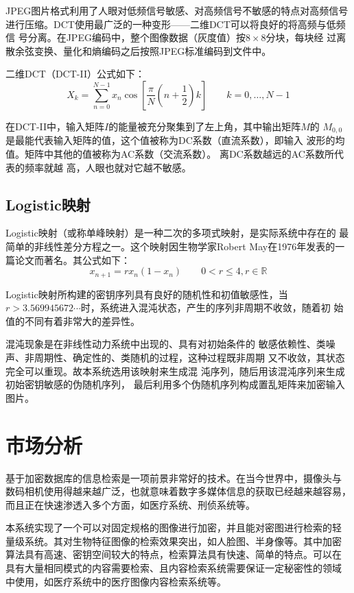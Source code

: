 JPEG图片格式利用了人眼对低频信号敏感、对高频信号不敏感的特点对高频信号
进行压缩。DCT使用最广泛的一种变形——二维DCT可以将良好的将高频与低频信
号分离。在JPEG编码中，整个图像数据（灰度值）按$8 \times 8$分块，每块经
过离散余弦变换、量化和熵编码之后按照JPEG标准编码到文件中。

二维DCT（DCT-II）公式如下：
\begin{displaymath}
X_k = \sum_{n = 0}^{N - 1} x_n \cos \left[\frac{\pi} N \left(n +
        \frac1 2\right) k\right] \qquad k = 0, \dotsc, N - 1
\end{displaymath}

在DCT-II中，输入矩阵$I$的能量被充分聚集到了左上角，其中输出矩阵$M$的
$M_{0, 0}$是最能代表输入矩阵的值，这个值被称为DC系数（直流系数），即输入
波形的均值。矩阵中其他的值被称为AC系数（交流系数）。
离DC系数越远的AC系数所代表的频率就越
高，人眼也就对它越不敏感。



\subsection{Logistic映射}
Logistic映射（或称单峰映射）是一种二次的多项式映射，是实际系统中存在的
最简单的非线性差分方程之一\cite{yang2011}。这个映射因生物学家Robert
May在1976年发表的一篇论文而著名。其公式如下：
\begin{displaymath}
x_{n + 1} = rx_n(1 - x_n) \qquad 0 < r \leq 4, r \in \mathbb{R}
\end{displaymath}

Logistic映射所构建的密钥序列具有良好的随机性和初值敏感性，当$r >
3.569945672\dotsb$时，系统进入混沌状态，产生的序列非周期不收敛，随着初
始值的不同有着非常大的差异性\cite{yang2011}。

混沌现象是在非线性动力系统中出现的、具有对初始条件的
敏感依赖性、类噪声、非周期性、确定性的、类随机的过程，这种过程既非周期
又不收敛，其状态完全可以重现\cite{lu2007}。故本系统选用该映射来生成混
沌序列，随后用该混沌序列来生成初始密钥敏感的伪随机序列，
最后利用多个伪随机序列构成置乱矩阵来加密输入图片。

\section{市场分析}
\label{sec:market-analysis}

基于加密数据库的信息检索是一项前景非常好的技术。在当今世界中，摄像头与
数码相机使用得越来越广泛，也就意味着数字多媒体信息的获取已经越来越容易，
而且正在快速渗透入多个方面，如医疗系统、刑侦系统等。

本系统实现了一个可以对固定规格的图像进行加密，并且能对密图进行检索的轻
量级系统。其对生物特征图像的检索效果突出，如人脸图、半身像等。其中加密
算法具有高速、密钥空间较大的特点，检索算法具有快速、简单的特点。可以在
具有大量相同模式的内容需要检索、且内容检索系统需要保证一定秘密性的领域
中使用，如医疗系统中的医疗图像内容检索系统等。

